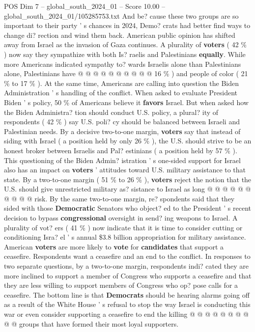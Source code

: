 \begin{textsample}{POS Dim 7 – global\_south\_2024\_01 – Score 10.00 – global\_south\_2024\_01/105285753.txt}
And be? cause these two groups are so important to their party ' s chances in 2024, Demo? crats had better find ways to change di? rection and wind them back.
American public opinion has shifted away from Israel as the invasion of Gaza continues.
A plurality of \textbf{voters} ( 42 \% ) now say they sympathize with both Is? raelis and Palestinians \textbf{equally}.
While more Americans indicated sympathy to? wards Israelis alone than Palestinians alone, Palestinians have @ @ @ @ @ @ @ @ @ @ 16 \% ) and people of color ( 21 \% to 17 \% ).
At the same time, Americans are calling into question the Biden Administration ' s handling of the conflict.
When asked to evaluate President Biden ' s policy, 50 \% of Americans believe it \textbf{favors} Israel.
But when asked how the Biden Administra? tion should conduct U.S. policy, a plural? ity of respondents ( 42 \% ) say U.S. poli? cy should be balanced between Israeli and Palestinian needs.
By a decisive two-to-one margin, \textbf{voters} say that instead of siding with Israel ( a position held by only 26 \% ), the U.S. should strive to be an honest broker between Israelis and Pal? estinians ( a position held by 57 \% ).
This questioning of the Biden Admin? istration ' s one-sided support for Israel also has an impact on \textbf{voters} ' attitudes toward U.S. military assistance to that state.
By a two-to-one margin ( 51 \% to 26 \% ), \textbf{voters} reject the notion that the U.S. should give unrestricted military as? sistance to Israel as long @ @ @ @ @ @ @ @ @ @ risk.
By the same two-to-one margin, re? spondents said that they sided with those \textbf{Democratic} Senators who object? ed to the President ' s recent decision to bypass \textbf{congressional} oversight in send? ing weapons to Israel.
A plurality of vot? ers ( 41 \% ) now indicate that it is time to consider cutting or conditioning Isra? el ' s annual \$3.8 billion appropriation for military assistance.
American \textbf{voters} are more likely to \textbf{vote} for \textbf{candidates} that support a ceasefire.
Respondents want a ceasefire and an end to the conflict.
In responses to two separate questions, by a two-to-one margin, respondents indi? cated they are more inclined to support a member of Congress who supports a ceasefire and that they are less willing to support members of Congress who op? pose calls for a ceasefire.
The bottom line is that \textbf{Democrats} should be hearing alarms going off as a result of the White House ' s refusal to stop the way Israel is conducting this war or even consider supporting a ceasefire to end the killing @ @ @ @ @ @ @ @ @ @ groups that have formed their most loyal supporters.

\end{textsample}
